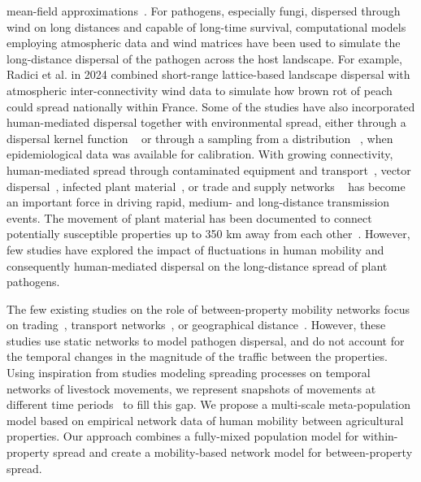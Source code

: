 \documentclass[aps,physrev,reprint,superscriptaddress]{revtex4-1}
\begin{document}
mean-field approximations~\cite{forster2007optimizing}. For pathogens, especially fungi, dispersed through wind on long distances and capable of long-time survival, computational models employing atmospheric data and wind matrices \cite{kling2020global,kling2021global,brown2002aerial,leyronas2018assessing,radici2022early,brodsky2023assessing} have been used to simulate the long-distance dispersal of the pathogen across the host landscape. For example, Radici et al. in 2024 \cite{radici2024metapopulation} combined short-range lattice-based landscape dispersal with atmospheric inter-connectivity wind data to simulate how brown rot of peach could spread nationally within France. Some of the studies have also incorporated human-mediated dispersal together with environmental spread, either through a dispersal kernel function ~\cite{godding2023developing, ellis2025} or through a sampling from a distribution ~\cite{chaves2025}, when epidemiological data was available for calibration. With growing connectivity, human-mediated spread through contaminated equipment and transport~\cite{ocimati2021farmer, hardy_pathway_2013,hodkinson1997plant}, vector dispersal~\cite{ellis2025}, infected plant material~\cite{ristaino2000new}, or trade and supply networks ~\cite{pautasso2014network, marshall2021assessing,andersen2019modeling,moslonka2011networks,benedetti_spatial_2017,numminen2020spread} has become an important force in driving rapid, medium- and long-distance transmission events. The movement of plant material has been documented to connect potentially susceptible properties up to 350 km away from each other~\cite{szyniszewska2021smallholder}. However, few studies have explored the impact of fluctuations in human mobility and consequently human-mediated dispersal on the long-distance spread of plant pathogens.

  The few existing studies on the role of between-property mobility networks focus on trading~\cite{marshall2021assessing,andersen2019modeling,moslonka2011networks}, transport networks~\cite{benedetti_spatial_2017,numminen2020spread}, or geographical distance~\cite{sutrave2012identifying,strona2017network}. However, these studies use static networks to model pathogen dispersal, and do not account for the temporal changes in the magnitude of the traffic between the properties. Using inspiration from studies modeling spreading processes on temporal networks of livestock movements, we represent snapshots of movements at different time periods~\cite{bajardi2011dynamical,bajardi2012optimizing,valdano2015predicting,schirdewahn2021early} to fill this gap. We propose a multi-scale meta-population model based on empirical network data of human mobility between agricultural properties. Our approach combines a fully-mixed population model for within-property spread and create a mobility-based network model for between-property spread.
\end{document}
